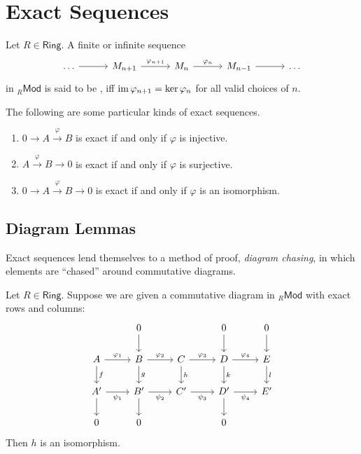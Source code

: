 \section*{Exact Sequences}

\begin{definition}
	Let $R \in \mathsf{Ring}$. A finite or infinite sequence
	\begin{equation*}
		\begin{tikzcd}[column sep = 3em]
			\dots \arrow[r] & M_{n + 1} \arrow[r,"\varphi_{n + 1}"] & M_n \arrow[r,"\varphi_n"] & M_{n - 1} \arrow[r] & \dots 
		\end{tikzcd}
	\end{equation*}
	\noindent in $_{R}\mathsf{Mod}$ is said to be , iff $\operatorname{im} \varphi_{n + 1} = \ker \varphi_n$ for all valid choices of $n$. 
\end{definition}

\begin{examples}
	The following are some particular kinds of exact sequences.
	\begin{enumerate}[label = \textup{(}\alph*\textup{)},wide = 0pt]
		\item $0 \to A \overset{\varphi}{\to} B$ is exact if and only if $\varphi$ is injective.
		\item $A \overset{\varphi}{\to} B \to 0$ is exact if and only if $\varphi$ is surjective.
		\item $0 \to A \overset{\varphi}{\to} B \to 0$ is exact if and only if $\varphi$ is an isomorphism.
	\end{enumerate}
\end{examples}

\subsection*{Diagram Lemmas}
Exact sequences lend themselves to a method of proof, \emph{diagram chasing}, in which elements are ``chased'' around commutative diagrams.

\begin{proposition}
	Let $R \in \mathsf{Ring}$. Suppose we are given a commutative diagram in $_{R}\mathsf{Mod}$ with exact rows and columns:
	\begin{equation*}
		\begin{tikzcd}
			& 0\arrow[d] & & 0\arrow[d] & 0\arrow[d]\\
			A \arrow[d,"f"]\arrow[r,"\varphi_1"] & B \arrow[r,"\varphi_2"]\arrow[d,"g"] & C \arrow[r,"\varphi_3"]\arrow[d,"h"] & D \arrow[r,"\varphi_4"]\arrow[d,"k"] & E \arrow[d,"l"]\\
			A' \arrow[r,"\psi_1"']\arrow[d] & B' \arrow[r,"\psi_2"']\arrow[d] & C' \arrow[r,"\psi_3"'] & D' \arrow[r,"\psi_4"']\arrow[d] & E'\\
			0 & 0 & & 0
		\end{tikzcd}
	\end{equation*}
	Then $h$ is an isomorphism.
\end{proposition}

